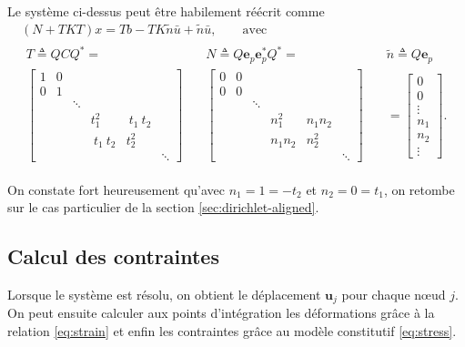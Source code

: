 \documentclass[12pt]{article}
\begin{document}
Le système ci-dessus peut être habilement réécrit comme
\begin{gather}
    (N + T K T) x = T b - T K \tilde n \bar u + \tilde n \bar u, \qquad 
    \text{avec }\\[1em]
    \begin{array}{c|c|c}
        T \triangleq Q C Q^* = &
        N \triangleq Q \mathbf{e}_p \mathbf{e}_p^* Q^* = &
        \tilde n \triangleq Q \mathbf{e}_p\\
        \begin{bmatrix}
            1 & 0 &        &        &        & \\
            0 & 1 &        &        &        & \\
              &   & \ddots &        &        & \\
              &   &        & t_1^2  & \:t_1\:t_2 & \\
              &   &        & \:t_1\:t_2 & t_2^2  & \\
              &   &        &        &        & \ddots
        \end{bmatrix}\quad&
        \begin{bmatrix}
            0 & 0 &        &        &        & \\
            0 & 0 &        &        &        & \\
              &   & \ddots &        &        & \\
              &   &        & n_1^2  & n_1n_2 & \\
              &   &        & n_1n_2 & n_2^2  & \\
              &   &        &        &        & \ddots
        \end{bmatrix}\quad&
        =\begin{bmatrix}
            0\\
            0\\
            \vdots\\
            n_1\\
            n_2\\
            \vdots
        \end{bmatrix}.
    \end{array}
\end{gather}

On constate fort heureusement qu'avec $n_1=1=-t_2$ et $n_2=0=t_1$, on retombe sur 
le cas particulier de la section \ref{sec:dirichlet-aligned}.

\subsection{Calcul des contraintes}
\label{sec:contraintes}
Lorsque le système est résolu, on obtient le déplacement $\mathbf{u}_j$ 
pour chaque n\oe ud $j$. On peut ensuite calculer aux points d'intégration
les déformations grâce à la relation \eqref{eq:strain} et enfin les contraintes 
grâce au modèle constitutif \eqref{eq:stress}. 
\end{document}
